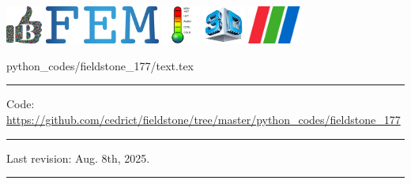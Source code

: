 \noindent
\includegraphics[height=1.25cm]{images/pictograms/benchmark}
\includegraphics[height=1.25cm]{images/pictograms/FEM}
\includegraphics[height=1.25cm]{images/pictograms/temperature}
\includegraphics[height=1.25cm]{images/pictograms/3d}
\includegraphics[height=1.25cm]{images/pictograms/paraview}


\begin{flushright} {\tiny {\color{gray} python\_codes/fieldstone\_177/text.tex}} \end{flushright}

%

\par\noindent\rule{\textwidth}{0.4pt}

\begin{center}
\inpython
{\small Code: \url{https://github.com/cedrict/fieldstone/tree/master/python_codes/fieldstone_177}}
\end{center}

\par\noindent\rule{\textwidth}{0.4pt}



Last revision: Aug. 8th, 2025.

\par\noindent\rule{\textwidth}{0.4pt}

